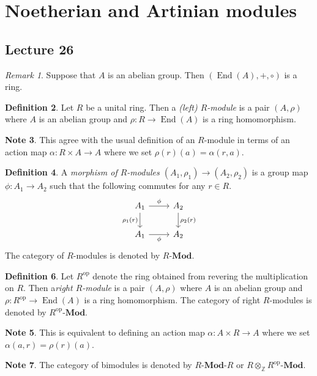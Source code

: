 \documentclass[10pt,letterpaper,cm]{nupset}
\theoremstyle{definition}
\newtheorem{definition}{Definition}[subsection]
\newtheorem{note}[definition]{Note}
\theoremstyle{theorem}
\theoremstyle{remark}
\newtheorem{remark}[definition]{Remark}
\newcommand{\Z}{\mathbb Z}
\newcommand{\1}{\mathbf{1}}
\newcommand{\0}{\vec 0}
\DeclareMathOperator{\op}{op}
\DeclareMathOperator{\ed}{End}
\begin{document}
\section{Noetherian and Artinian modules}

\subsection{Lecture 26}

\begin{remark}
Suppose that $A$ is an abelian group. Then $(\ed(A), +, \circ)$ is a ring. 
\end{remark}

\begin{definition}
Let $R$ be a unital ring. Then a \textit{(left) $R$-module} is a pair $(A, \rho)$ where $A$ is an abelian group and $\rho : R \to \ed(A)$ is a ring homomorphism.
\end{definition}
\begin{note}
This agree with the usual definition of an $R$-module in terms of an action map $\alpha : R\times A \to A$ where we set $\rho(r)(a) = \alpha(r, a)$.
\end{note}

\begin{definition}
A \textit{morphism of $R$-modules $(A_1, \rho_1) \to (A_2, \rho_2)$} is a group map $\phi : A_1 \to A_2$ such that the following commutes for any $r\in R$.
\[
\begin{tikzcd}
A_1 \arrow[d, "\rho_1(r)"'] \arrow[r, "\phi"] & A_2 \arrow[d, "\rho_2(r)"] \\
A_1 \arrow[r, "\phi"'] & A_2
\end{tikzcd}
\] The category of $R$-modules is denoted by $R$-$\mathbf{Mod}$.
\end{definition}

\begin{definition}
Let $R^{\op}$ denote the ring obtained from revering the multiplication on $R$. Then a\textit{right $R$-module} is a pair $(A, \rho)$ where $A$ is an abelian group and $\rho : R^{\op} \to \ed(A)$ is a ring homomorphism. The category of right $R$-modules is denoted by $R^{\op}$-$\mathbf{Mod}$.
\begin{note}
This is equivalent to defining an action map $\alpha : A \times R \to A$ where we set $\alpha(a, r) = \rho(r)(a)$.
\end{note}
\end{definition}

\begin{note}
The category of bimodules is denoted by $R$-$\mathbf{Mod}$-$R$ or $R \otimes_{\Z}R^{\op}$-$\mathbf{Mod}$.
\end{note}
\end{document}
